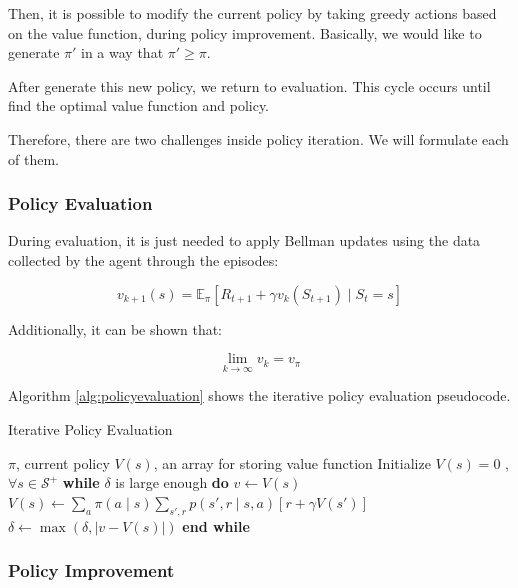 Then, it is possible to modify the current policy by taking greedy actions based on the value function, during policy improvement. Basically, we would like to generate $\pi'$ in a way that $\pi' \geq \pi$.

After generate this new policy, we return to evaluation. This cycle occurs until find the optimal value function and policy.

Therefore, there are two challenges inside policy iteration. We will formulate each of them.

\subsubsection{Policy Evaluation}

During evaluation, it is just needed to apply Bellman updates using the data collected by the agent through the episodes:

\begin{equation}
v_{k+1}(s) = \mathbb{E}_{\pi}[R_{t+1} + \gamma v_{k}(S_{t+1}) \mid S_{t} = s]
\end{equation}

Additionally, it can be shown that:

\begin{equation}
\lim_{k \rightarrow \infty} v_{k} = v_{\pi}
\end{equation}

Algorithm \ref{alg:policyevaluation} shows the iterative policy evaluation pseudocode.

\begin{algorithm}
	\caption{Iterative Policy Evaluation}
	\begin{algorithmic}
	\REQUIRE $\pi$, current policy
	\REQUIRE $V(s)$, an array for storing value function
	\STATE Initialize $V(s) = 0$ , $\forall s \in \mathcal{S}^{+}$ 
	\STATE \textbf{while} $\delta$ is large enough \textbf{do}
	\STATE \hspace{5mm} $v \leftarrow V(s)$
	\STATE \hspace{5mm} $V(s) \leftarrow \sum_{a} \pi(a \mid s) \sum_{s',r} p(s',r \mid s,a)[r + \gamma V(s')]$
	\STATE \hspace{5mm} $\delta \leftarrow \max(\delta, \lvert v - V(s) \rvert)$
	\STATE \textbf{end while} 	
	\end{algorithmic}
	\label{alg:policyevaluation}	
\end{algorithm}

\subsubsection{Policy Improvement}


